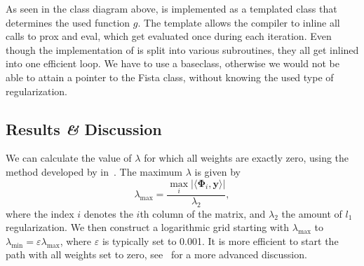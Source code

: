 
       

As seen in the class diagram above, \fista is implemented as a templated class
that determines the used function \(g\).
The template allows the compiler to inline all calls to prox and eval, which get
evaluated once during each iteration.
Even though the implementation of \fista is split into various subroutines, they
all get inlined into one efficient loop.
We have to use a baseclass, otherwise we would not be able to attain a pointer
to the Fista class, without knowing the used type of regularization.

\subsection{Results \textit{\&} Discussion}
We can calculate the value of \(\lambda\) for which all weights are exactly
zero, using the method developed by \citeauthor{regularizationpaths} in~\cite{regularizationpaths}.
The maximum \(\lambda\) is given by
\begin{equation*}
  \lambda_{\text{max}} = \frac{\max_i \vert \langle \bm{\Phi}_i, \bm{y} \rangle \vert}{\lambda_2},
\end{equation*}
where the index \(i\) denotes the \(i\)th column of the matrix, and
\(\lambda_2\) the amount of \(l_1\) regularization.
We then construct a logarithmic grid starting with \(\lambda_{\text{max}}\) to
\(\lambda_{\text{min}} = \varepsilon \lambda_{\text{max}}\), where
\(\varepsilon\) is typically set to 0.001.
It is more efficient to start the path with all weights set to zero, see~\cite{regularizationpaths} for a more advanced discussion.


